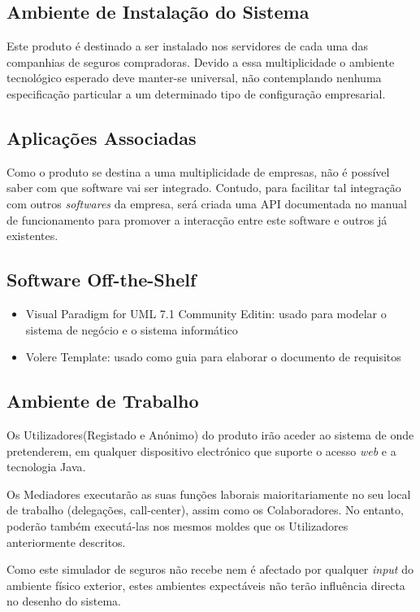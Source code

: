 \subsection{Ambiente de Instalação do Sistema}


Este produto é destinado a ser instalado nos servidores de cada uma das companhias de seguros compradoras. Devido a essa multiplicidade o ambiente tecnológico esperado deve manter-se universal, não contemplando nenhuma especificação particular a um determinado tipo de configuração empresarial.

\subsection{Aplicações Associadas}
Como o produto se destina a uma multiplicidade de empresas, não é possível saber com que software vai ser integrado. Contudo, para facilitar tal integração com outros \emph{softwares} da empresa, será criada uma API documentada no manual de funcionamento para promover a interacção entre este software e outros já existentes.

\subsection{Software Off-the-Shelf}
\begin{itemize}
\item Visual Paradigm for UML 7.1 Community Editin: usado para modelar o sistema de negócio e o sistema informático
\item Volere Template: usado como guia para elaborar o documento de requisitos
\end{itemize}

\subsection{Ambiente de Trabalho}
Os Utilizadores(Registado e Anónimo) do produto irão aceder ao sistema de onde pretenderem, em qualquer dispositivo electrónico que suporte o acesso \emph{web} e a tecnologia Java.

Os Mediadores executarão as suas funções laborais maioritariamente no seu local de trabalho (delegações, call-center), assim como os Colaboradores. No entanto, poderão também executá-las nos mesmos moldes que os Utilizadores anteriormente descritos.

Como este simulador de seguros não recebe nem é afectado por qualquer \emph{input} do ambiente físico exterior, estes ambientes expectáveis não terão influência directa no desenho do sistema.

